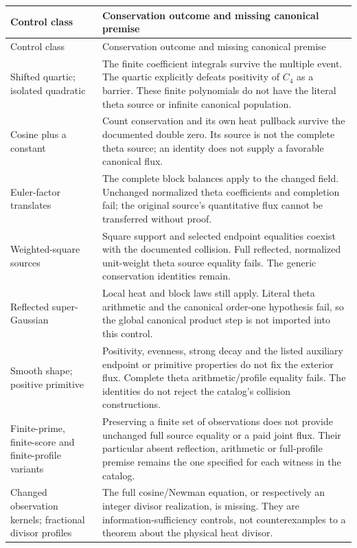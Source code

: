 \begingroup
\small
\setlength{\tabcolsep}{5pt}
\begin{longtable}{@{}p{}p{}@{}}
\toprule
Control class & Conservation outcome and missing canonical premise\\
\midrule
\endfirsthead
\toprule
Control class & Conservation outcome and missing canonical premise\\
\midrule
\endhead
\bottomrule
\endfoot
Shifted quartic; isolated quadratic &
The finite coefficient integrals survive the multiple event. The
quartic explicitly defeats positivity of $C_4$ as a barrier. These
finite polynomials do not have the literal theta source or infinite
canonical population.\\[5pt]
Cosine plus a constant &
Count conservation and its own heat pullback survive the documented
double zero. Its source is not the complete theta source; an identity
does not supply a favorable canonical flux.\\[5pt]
Euler-factor translates &
The complete block balances apply to the changed field. Unchanged
normalized theta coefficients and completion fail; the original
source's quantitative flux cannot be transferred without proof.\\[5pt]
Weighted-square sources &
Square support and selected endpoint equalities coexist with the
documented collision. Full reflected, normalized unit-weight theta
source equality fails. The generic conservation identities remain.\\[5pt]
Reflected super-Gaussian &
Local heat and block laws still apply. Literal theta arithmetic and
the canonical order-one hypothesis fail, so the global canonical
product step is not imported into this control.\\[5pt]
Smooth shape; positive primitive &
Positivity, evenness, strong decay and the listed auxiliary endpoint
or primitive properties do not fix the exterior flux. Complete theta
arithmetic/profile equality fails. The identities do not reject the
catalog's collision constructions.\\[5pt]
Finite-prime, finite-score and finite-profile variants &
Preserving a finite set of observations does not provide unchanged
full source equality or a paid joint flux. Their particular absent
reflection, arithmetic or full-profile premise remains the one
specified for each witness in the catalog.\\[5pt]
Changed observation kernels; fractional divisor profiles &
The full cosine/Newman equation, or respectively an integer divisor
realization, is missing. They are information-sufficiency controls,
not counterexamples to a theorem about the physical heat divisor.\\
\end{longtable}
\endgroup

